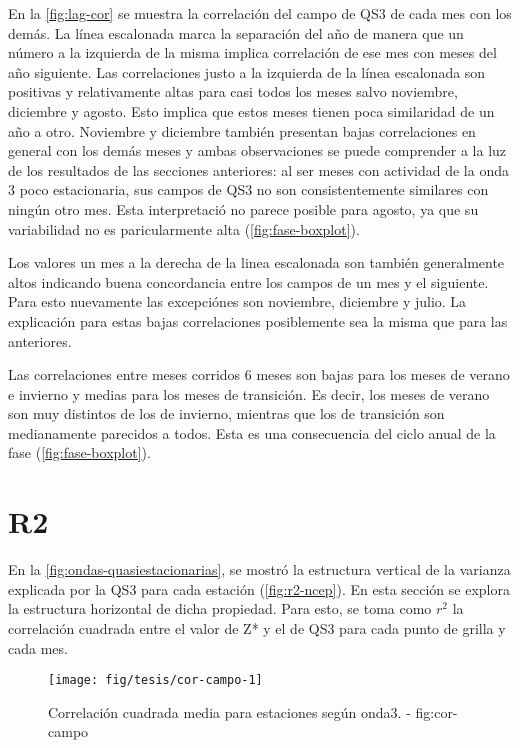 \documentclass[spanish,a4paper,12p]{book}
\begin{document}
En la \autoref{fig:lag-cor} se muestra la correlación del campo de QS3
de cada mes con los demás. La línea escalonada marca la separación del
año de manera que un número a la izquierda de la misma implica
correlación de ese mes con meses del año siguiente. Las correlaciones
justo a la izquierda de la línea escalonada son positivas y
relativamente altas para casi todos los meses salvo noviembre, diciembre
y agosto. Esto implica que estos meses tienen poca similaridad de un año
a otro. Noviembre y diciembre también presentan bajas correlaciones en
general con los demás meses y ambas observaciones se puede comprender a
la luz de los resultados de las secciones anteriores: al ser meses con
actividad de la onda 3 poco estacionaria, sus campos de QS3 no son
consistentemente similares con ningún otro mes. Esta interpretació no
parece posible para agosto, ya que su variabilidad no es paricularmente
alta (\autoref{fig:fase-boxplot}).

Los valores un mes a la derecha de la linea escalonada son también
generalmente altos indicando buena concordancia entre los campos de un
mes y el siguiente. Para esto nuevamente las excepciónes son noviembre,
diciembre y julio. La explicación para estas bajas correlaciones
posiblemente sea la misma que para las anteriores.

Las correlaciones entre meses corridos 6 meses son bajas para los meses
de verano e invierno y medias para los meses de transición. Es decir,
los meses de verano son muy distintos de los de invierno, mientras que
los de transición son medianamente parecidos a todos. Esta es una
consecuencia del ciclo anual de la fase (\autoref{fig:fase-boxplot}).

\section{R2}\label{r2}

En la \autoref{fig:ondas-quasiestacionarias}, se mostró la estructura
vertical de la varianza explicada por la QS3 para cada estación
(\autoref{fig:r2-ncep}). En esta sección se explora la estructura
horizontal de dicha propiedad. Para esto, se toma como \(r^2\) la
correlación cuadrada entre el valor de Z* y el de QS3 para cada punto de
grilla y cada mes.

\begin{figure*}
\texttt{[image: fig/tesis/cor-campo-1]} \caption{Correlación cuadrada media para estaciones según onda3. - fig:cor-campo}\label{fig:cor-campo}
\end{figure*}
\end{document}
